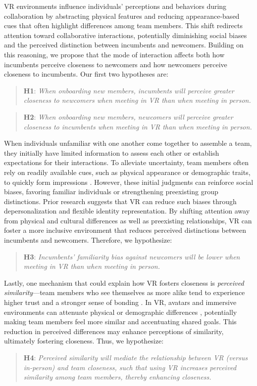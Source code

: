 VR environments influence individuals' perceptions and behaviors during collaboration by abstracting physical features and reducing appearance-based cues that often highlight differences among team members. This shift redirects attention toward collaborative interactions, potentially diminishing social biases and the perceived distinction between incumbents and newcomers. Building on this reasoning, we propose that the mode of interaction affects both how incumbents perceive closeness to newcomers and how newcomers perceive closeness to incumbents. Our first two hypotheses are:

\begin{quote}
    \textbf{H1}: \textit{When onboarding new members, incumbents will perceive greater closeness to newcomers when meeting in VR than when meeting in person.}
\end{quote}
\begin{quote}
    \textbf{H2}: \textit{When onboarding new members, newcomers will perceive greater closeness to incumbents when meeting in VR than when meeting in person.}
\end{quote}

When individuals unfamiliar with one another come together to assemble a team, they initially have limited information to assess each other or establish expectations for their interactions. To alleviate uncertainty, team members often rely on readily available cues, such as physical appearance or demographic traits, to quickly form impressions \cite{allport1954nature,hinds2000choosing}. However, these initial judgments can reinforce social biases, favoring familiar individuals or strengthening preexisting group distinctions. Prior research suggests that VR can reduce such biases through depersonalization and flexible identity representation. By shifting attention away from physical and cultural differences as well as preexisting relationships, VR can foster a more inclusive environment that reduces perceived distinctions between incumbents and newcomers. Therefore, we hypothesize:
\begin{quote}
    \textbf{H3}: \textit{Incumbents' familiarity bias against newcomers will be lower when meeting in VR than when meeting in person.}
\end{quote}

Lastly, one mechanism that could explain how VR fosters closeness is \textit{perceived similarity}---team members who see themselves as more alike tend to experience higher trust and a stronger sense of bonding \cite{zellmer2008and, mannix2005differences}. In VR, avatars and immersive environments can attenuate physical or demographic differences \cite{lopez2019investigating, marini2022can}, potentially making team members feel more similar and accentuating shared goals. This reduction in perceived differences may enhance perceptions of similarity, ultimately fostering closeness. Thus, we hypothesize:
\begin{quote}
    \textbf{H4}: \textit{Perceived similarity will mediate the relationship between VR (versus in-person) and team closeness, such that using VR increases perceived similarity among team members, thereby enhancing closeness.}
\end{quote}
